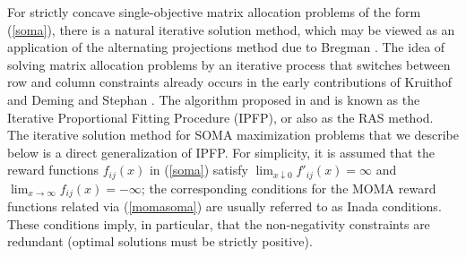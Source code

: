 \documentclass{article}
\theoremstyle{definition}
\begin{document}
For strictly concave single-objective matrix allocation problems of the form (\ref{soma}), there is a natural iterative solution method, which may be viewed as an application of the alternating projections method due to Bregman \cite{Bregman}. The idea of solving matrix allocation problems by an iterative process that switches between row and column constraints already occurs in the early contributions of Kruithof \cite{Kruithof} and Deming and Stephan \cite{Deming}.
The algorithm proposed in \cite{Kruithof} and \cite{Deming} is known as the Iterative Proportional Fitting Procedure (IPFP), or also as the RAS method. The iterative solution method for SOMA maximization problems that we describe below is a direct generalization of IPFP. For simplicity, it is assumed that the reward functions $f_{ij}(x)$ in (\ref{soma}) satisfy $\lim_{x \downarrow 0} f'_{ij}(x) = \infty$ and $\lim_{x \rightarrow \infty} f_{ij}(x) = -\infty$; the corresponding conditions for the MOMA reward functions related via (\ref{momasoma}) are usually referred to as Inada conditions. These conditions imply, in particular, that the non-negativity constraints are redundant (optimal solutions must be strictly positive).
\end{document}
